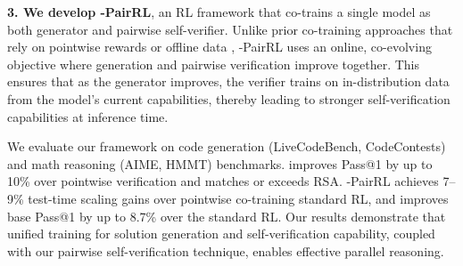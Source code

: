\textbf{3. We develop \method{}-PairRL}, an RL framework that co-trains a single model as both generator and pairwise self-verifier. Unlike prior co-training approaches that rely on pointwise rewards \citep{sareen2025puttingvaluerlbetter, liu2025trustverifyselfverificationapproach} or offline data \citep{venkatraman2025recursiveselfaggregationunlocksdeep}, \method{}-PairRL uses an online, co-evolving objective where generation and pairwise verification improve together. This ensures that as the generator improves, the verifier trains on in-distribution data from the model's current capabilities, thereby leading to stronger self-verification capabilities at inference time.

We evaluate our framework on code generation (LiveCodeBench, CodeContests) and math reasoning (AIME, HMMT) benchmarks. \pairinfer{} improves Pass@1 by up to 10\% over pointwise verification and matches or exceeds RSA. \method{}-PairRL achieves 7--9\% test-time scaling gains over pointwise co-training standard RL, and improves base Pass@1 by up to 8.7\% over the standard RL. Our results demonstrate that unified training for solution generation and self-verification capability, coupled with our pairwise self-verification technique, enables effective parallel reasoning.


